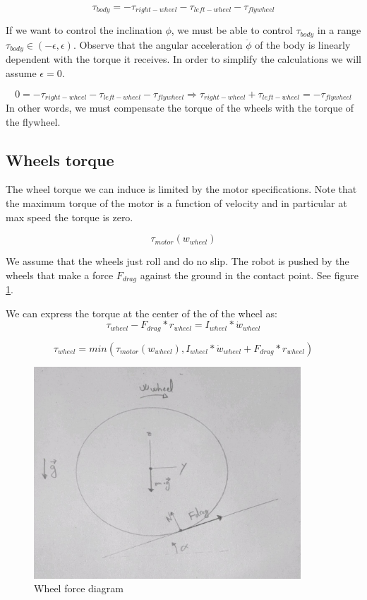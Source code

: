 \[\tau_{body} = -\tau_{right-wheel} -\tau_{left-wheel} -\tau_{flywheel} \]

If we want to control the inclination $\phi$, we must be able to control $\tau_{body}$ in a range $\tau_{body} \in (-\epsilon, \epsilon)$. Observe that the angular acceleration $\ddot{\phi}$ of the body is linearly dependent with the torque it receives. In order to simplify the calculations we will assume $\epsilon = 0$.

\begin{equation} \label{eq:control equation}
0 = -\tau_{right-wheel} -\tau_{left-wheel} -\tau_{flywheel} \Rightarrow \tau_{right-wheel} +\tau_{left-wheel} = -\tau_{flywheel}
\end{equation}
In other words, we must compensate the torque of the wheels with the torque of the flywheel.

\subsection{Wheels torque}
The wheel torque we can induce is limited by the motor specifications. Note that the maximum torque of the motor is a function of velocity and in particular at max speed the torque is zero.

\[\tau_{motor} (w_{wheel}) \]


We assume that the wheels just roll and do no slip.
The robot is pushed by the wheels that make a force $F_{drag}$ against the ground in the contact point. See figure \ref{fig:Wheel force diagram}.

We can express the torque at the center of the of the wheel as:
\[\tau_{wheel} - F_{drag} * r_{wheel} = I_{wheel} * \dot{w}_{wheel} \]

\begin{equation} \label{wheel torque equation}
\tau_{wheel} = min(\tau_{motor} (w_{wheel}),I_{wheel} * \dot{w}_{wheel} + F_{drag} * r_{wheel})
\end{equation}
\begin{figure}[ht]
	\centering
	\includegraphics[width=10cm]{img/wheel_diagram.jpg}
	\caption{Wheel force diagram}
	\label{fig:Wheel force diagram}
\end{figure}


